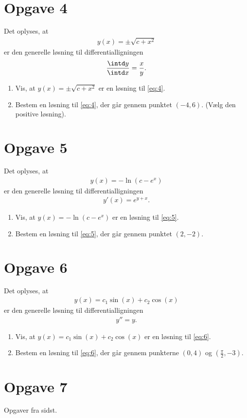 \section*{Opgave 4}
	Det oplyses, at 
	\begin{align*}
		y(x) = \pm\sqrt{c+x^2}
	\end{align*}
	er den generelle løsning til differentialligningen
	\begin{align}\label{eq:4}
		\frac{\intd y}{\intd x} = \frac{x}{y}.
	\end{align}
\begin{enumerate}[label=\roman*)]
\item Vis, at $y(x) = \pm\sqrt{c+x^2}$ er en løsning til \eqref{eq:4}.
\item Bestem en løsning til \eqref{eq:4}, der går gennem punktet $(-4,6)$. (Vælg den positive løsning).
\end{enumerate}


\section*{Opgave 5}
	Det oplyses, at 
	\begin{align*}
		y(x) = -\ln(c-e^x)
	\end{align*}
	er den generelle løsning til differentialligningen
	\begin{align}\label{eq:5}
		y'(x) = e^{y+x}.
	\end{align}
\begin{enumerate}[label=\roman*)]
\item Vis, at $y(x) = -\ln(c-e^x)$ er en løsning til \eqref{eq:5}.
\item Bestem en løsning til \eqref{eq:5}, der går gennem punktet $(2,-2)$. 
\end{enumerate}

\section*{Opgave 6}

	Det oplyses, at 
	\begin{align*}
		y(x) = c_1\sin(x)+c_2\cos(x)
	\end{align*}
	er den generelle løsning til differentialligningen
	\begin{align}\label{eq:6}
		y'' = y.
	\end{align}
\begin{enumerate}[label=\roman*)]
\item Vis, at $y(x) = c_1\sin(x)+c_2\cos(x)$ er en løsning til \eqref{eq:6}.
\item Bestem en løsning til \eqref{eq:6}, der går gennem punkterne $(0,4)$ og 
$\left(\frac{\pi}{2}, -3\right)$.
\end{enumerate}

\section*{Opgave 7}
Opgaver fra sidst.
